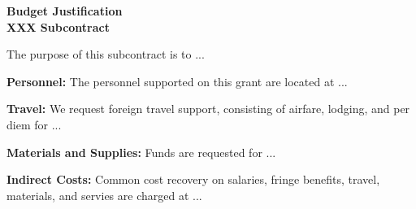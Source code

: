 \documentclass[onecolumn,11pt]{aastex}
\begin{document}
\begin{center}
{\bf \Large Budget Justification\\ XXX Subcontract}
\end{center}

The purpose of this subcontract is to ...

{\bf Personnel:} 
The personnel supported on this grant are located at ...

{\bf Travel:} We request foreign travel support, consisting of airfare, lodging,
and per diem for ...

{\bf Materials and Supplies:}  Funds are requested for ... 

{\bf Indirect Costs:}
Common cost recovery on salaries, fringe benefits, travel, materials, and servies are
charged at ...
\end{document}
